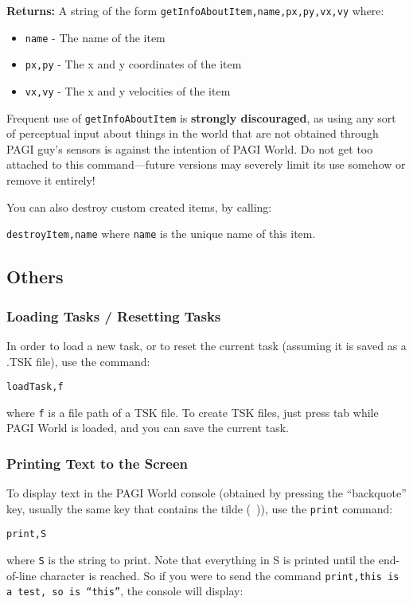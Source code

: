\noindent \textbf{Returns:} A string of the form \texttt{getInfoAboutItem,name,px,py,vx,vy} where:

\begin{itemize}
\item \texttt{name} - The name of the item
\item \texttt{px,py} - The x and y coordinates of the item
\item \texttt{vx,vy} - The x and y velocities of the item
\end{itemize}

Frequent use of \texttt{getInfoAboutItem} is \textbf{strongly discouraged}, as using any sort of perceptual input about things in the world that are not obtained through PAGI guy's sensors is against the intention of PAGI World. Do not get too attached to this command---future versions may severely limit its use somehow or remove it entirely!

You can also destroy custom created items, by calling:

\texttt{destroyItem,name} where \texttt{name} is the unique name of this item. 

\subsection{Others}

\subsubsection{Loading Tasks / Resetting Tasks}

In order to load a new task, or to reset the current task (assuming it is saved as a .TSK file), use the command:

\texttt{loadTask,f}

\noindent where \texttt{f} is a file path of a TSK file. To create TSK files, just press tab while PAGI World is loaded, and you can save the current task.

\subsubsection{Printing Text to the Screen}

To display text in the PAGI World console (obtained by pressing the ``backquote'' key, usually the same key that contains the tilde (~)), use the \texttt{print} command:

\texttt{print,S}

\noindent where \texttt{S} is the string to print. Note that everything in S is printed until the end-of-line character is reached. So if you were to send the command \texttt{print,this is a test, so is ``this''}, the console will display:

